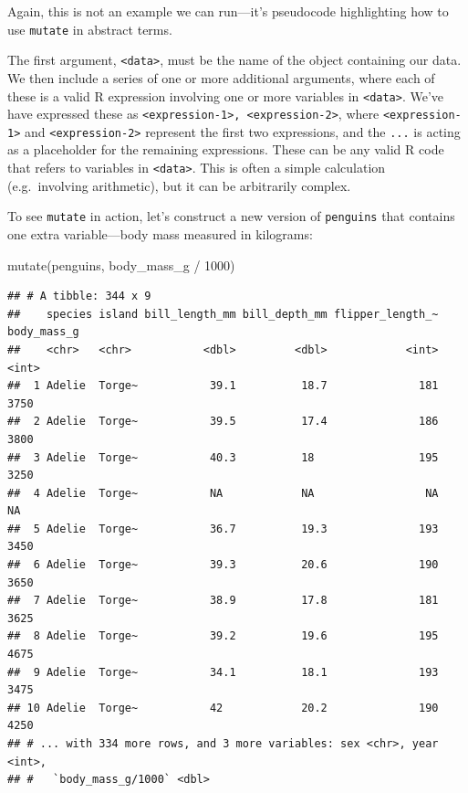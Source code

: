 \documentclass[
]{book}
\newenvironment{Shaded}{\begin{snugshade}}{\end{snugshade}}
\newcommand{\DecValTok}[1]{\textcolor[rgb]{0.00,0.00,0.81}{#1}}
\newcommand{\FunctionTok}[1]{\textcolor[rgb]{0.00,0.00,0.00}{#1}}
\newcommand{\NormalTok}[1]{#1}
\newcommand{\SpecialCharTok}[1]{\textcolor[rgb]{0.00,0.00,0.00}{#1}}
\begin{document}
Again, this is not an example we can run---it's pseudocode highlighting how to use \texttt{mutate} in abstract terms.

The first argument, \texttt{\textless{}data\textgreater{}}, must be the name of the object containing our data. We then include a series of one or more additional arguments, where each of these is a valid R expression involving one or more variables in \texttt{\textless{}data\textgreater{}}. We've have expressed these as \texttt{\textless{}expression-1\textgreater{},\ \textless{}expression-2\textgreater{}}, where \texttt{\textless{}expression-1\textgreater{}} and \texttt{\textless{}expression-2\textgreater{}} represent the first two expressions, and the \texttt{...} is acting as a placeholder for the remaining expressions. These can be any valid R code that refers to variables in \texttt{\textless{}data\textgreater{}}. This is often a simple calculation (e.g.~involving arithmetic), but it can be arbitrarily complex.

To see \texttt{mutate} in action, let's construct a new version of \texttt{penguins} that contains one extra variable---body mass measured in kilograms:

\begin{Shaded}
\begin{Highlighting}[]
\FunctionTok{mutate}\NormalTok{(penguins, body\_mass\_g }\SpecialCharTok{/} \DecValTok{1000}\NormalTok{)}
\end{Highlighting}
\end{Shaded}

\begin{verbatim}
## # A tibble: 344 x 9
##    species island bill_length_mm bill_depth_mm flipper_length_~ body_mass_g
##    <chr>   <chr>           <dbl>         <dbl>            <int>       <int>
##  1 Adelie  Torge~           39.1          18.7              181        3750
##  2 Adelie  Torge~           39.5          17.4              186        3800
##  3 Adelie  Torge~           40.3          18                195        3250
##  4 Adelie  Torge~           NA            NA                 NA          NA
##  5 Adelie  Torge~           36.7          19.3              193        3450
##  6 Adelie  Torge~           39.3          20.6              190        3650
##  7 Adelie  Torge~           38.9          17.8              181        3625
##  8 Adelie  Torge~           39.2          19.6              195        4675
##  9 Adelie  Torge~           34.1          18.1              193        3475
## 10 Adelie  Torge~           42            20.2              190        4250
## # ... with 334 more rows, and 3 more variables: sex <chr>, year <int>,
## #   `body_mass_g/1000` <dbl>
\end{verbatim}
\end{document}
